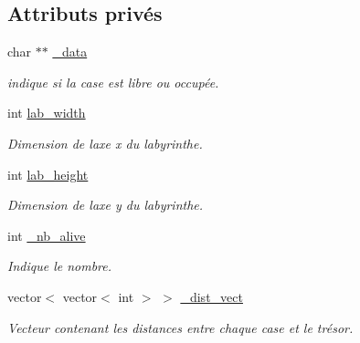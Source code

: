 \subsection*{Attributs privés}
\begin{DoxyCompactItemize}
\item 
char $\ast$$\ast$ \hyperlink{classLabyrinthe_a93ccbd26c14359bec6a9898575f69237}{\+\_\+data}
\begin{DoxyCompactList}\small\item\em indique si la case est libre ou occupée. \end{DoxyCompactList}\item 
int \hyperlink{classLabyrinthe_a6ae1d76761645024106ad6374305dd02}{lab\+\_\+width}
\begin{DoxyCompactList}\small\item\em Dimension de l\textquotesingle{}axe \textquotesingle{}x\textquotesingle{} du labyrinthe. \end{DoxyCompactList}\item 
int \hyperlink{classLabyrinthe_af48dc244a25af5aac1a9fca668dee82d}{lab\+\_\+height}
\begin{DoxyCompactList}\small\item\em Dimension de l\textquotesingle{}axe \textquotesingle{}y\textquotesingle{} du labyrinthe. \end{DoxyCompactList}\item 
int \hyperlink{classLabyrinthe_ad97a56882b720fa0f94acffde1d2c275}{\+\_\+nb\+\_\+alive}
\begin{DoxyCompactList}\small\item\em Indique le nombre. \end{DoxyCompactList}\item 
vector$<$ vector$<$ int $>$ $>$ \hyperlink{classLabyrinthe_a63f1ac088c5b93cd8c099e7cce3ef4dc}{\+\_\+dist\+\_\+vect}
\begin{DoxyCompactList}\small\item\em Vecteur contenant les distances entre chaque case et le trésor. \end{DoxyCompactList}\end{DoxyCompactItemize}

